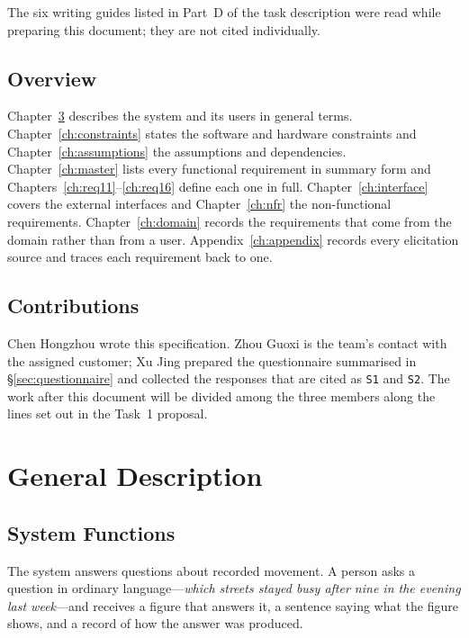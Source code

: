\documentclass[12pt,a4paper]{report}
\begin{document}
The six writing guides listed in Part~D of the task description were read
while preparing this document; they are not cited individually.

\section{Overview}
\label{sec:overview}

Chapter~\ref{ch:general} describes the system and its users in general
terms. Chapter~\ref{ch:constraints} states the software and hardware
constraints and Chapter~\ref{ch:assumptions} the assumptions and
dependencies. Chapter~\ref{ch:master} lists every functional requirement in
summary form and Chapters~\ref{ch:req11}--\ref{ch:req16} define each one in
full. Chapter~\ref{ch:interface} covers the external interfaces and
Chapter~\ref{ch:nfr} the non-functional requirements. Chapter~\ref{ch:domain}
records the requirements that come from the domain rather than from a user.
Appendix~\ref{ch:appendix} records every elicitation source and traces each
requirement back to one.

\section{Contributions}
\label{sec:contributions}

Chen Hongzhou wrote this specification. Zhou Guoxi is the team's contact with
the assigned customer; Xu Jing prepared the questionnaire summarised in
\S\ref{sec:questionnaire} and collected the responses that are cited as
\texttt{S1} and \texttt{S2}. The work after this document will be divided
among the three members along the lines set out in the Task~1 proposal.

\chapter{General Description}
\label{ch:general}

\section{System Functions}
\label{sec:system-functions}

The system answers questions about recorded movement. A person asks a
question in ordinary language---\emph{which streets stayed busy after nine
in the evening last week}---and receives a figure that answers it, a
sentence saying what the figure shows, and a record of how the answer was
produced.
\end{document}
